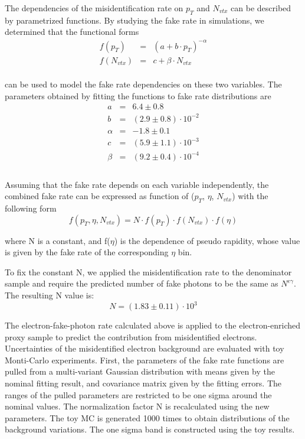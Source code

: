 \documentclass[thesis.tex]{subfiles}
\renewcommand\_{\textunderscore\allowbreak}
\begin{document}
The dependencies of the misidentification rate on $p_T$ and $N_{vtx}$ can be described by parametrized functions. By studying the fake rate in simulations, we determined that the functional forms \\
\begin{eqnarray*}
	f(p_{T})   &=& ( a + b\cdot p_T)^{-\alpha} \\
	f(N_{vtx}) &=& c + \beta \cdot N_{vtx}
\end{eqnarray*}\\
can be used to model the fake rate dependencies on these two variables. The parameters obtained by fitting the functions to fake rate distributions are \\
\begin{eqnarray*}
	a   &=& 6.4 \pm 0.8  \\
	b   &=& (2.9 \pm 0.8) \cdot 10^{-2} \\
	\alpha &=& -1.8 \pm 0.1 \\
	c &=& (5.9 \pm 1.1) \cdot 10^{-3} \\
	\beta &=& (9.2 \pm 0.4) \cdot 10^{-4} \\
\end{eqnarray*}\\

 Assuming that the fake rate depends on each variable independently, the combined fake rate can be expressed as function of ($p_T$, $\eta$, $N_{vtx}$) with the following form 
\begin{equation} 
	f(p_{T}, \eta, N_{vtx}) = N \cdot f(p_T) \cdot f(N_{vtx}) \cdot f(\eta)
\end{equation}

where N is a constant, and f($\eta$) is the dependence of pseudo rapidity, whose value is given by the fake rate of the corresponding $\eta$ bin. 

To fix the constant N, we applied the misidentification rate to the denominator sample and require the predicted number of fake photons to be the same as $N^{e\gamma}$. The resulting N value is: \\
\begin{equation} 
	N = (1.83 \pm 0.11) \cdot 10^{3}
\end{equation}


The electron-fake-photon rate calculated above is applied to the electron-enriched proxy sample to predict the contribution from misidentified electrons. Uncertainties of the misidentified electron background are evaluated with toy Monti-Carlo experiments. First, the parameters of the fake rate functions are pulled from a multi-variant Gaussian distribution with means given by the nominal fitting result, and covariance matrix given by the fitting errors. The ranges of the pulled parameters are restricted to be one sigma around the nominal values. The normalization factor N is recalculated using the new parameters. The toy MC is generated 1000 times to obtain distributions of the background variations. The one sigma band is constructed using the toy results.\\
\end{document}
